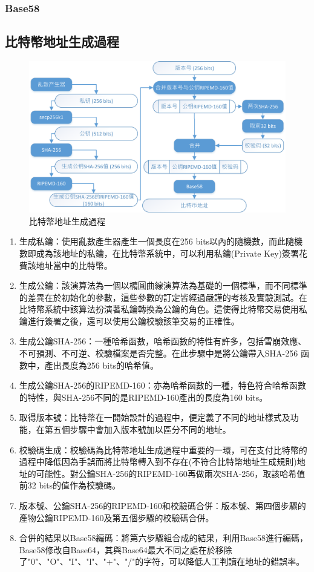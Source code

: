 			\subsubsection{Base58}

		\subsection{比特幣地址生成過程}

		\begin{figure}[h]
				\centering
				\includegraphics[width = .9\textwidth]{address.png}
				\caption{比特幣地址生成過程}\label{address}
		\end{figure}

		\begin{enumerate}
			\item 生成私鑰：使用亂數產生器產生一個長度在256 bits以內的隨機數，而此隨機數即成為該地址的私鑰，在比特幣系統中，可以利用私鑰(Private Key)簽署花費該地址當中的比特幣。
			\item 生成公鑰：該演算法為一個以橢圓曲線演算法為基礎的一個標準，而不同標準的差異在於初始化的參數，這些參數的訂定皆經過嚴謹的考核及實驗測試。在比特幣系統中該算法扮演著私鑰轉換為公鑰的角色。這使得比特幣交易使用私鑰進行簽署之後，還可以使用公鑰校驗該筆交易的正確性。
			\item 生成公鑰SHA-256：一種哈希函數，哈希函數的特性有許多，包括雪崩效應、不可預測、不可逆、校驗檔案是否完整。在此步驟中是將公鑰帶入SHA-256 函數中，產出長度為256 bits的哈希值。
			\item 生成公鑰SHA-256的RIPEMD-160：亦為哈希函數的一種，特色符合哈希函數的特性，與SHA-256不同的是RIPEMD-160產出的長度為160 bits。
			\item 取得版本號：比特幣在一開始設計的過程中，便定義了不同的地址樣式及功能，在第五個步驟中會加入版本號加以區分不同的地址。
			\item 校驗碼生成：校驗碼為比特幣地址生成過程中重要的一環，可在支付比特幣的過程中降低因為手誤而將比特幣轉入到不存在(不符合比特幣地址生成規則)地址的可能性。對公鑰SHA-256的RIPEMD-160再做兩次SHA-256，取該哈希值前32 bits的值作為校驗碼。
			\item 版本號、公鑰SHA-256的RIPEMD-160和校驗碼合併：版本號、第四個步驟的產物公鑰RIPEMD-160及第五個步驟的校驗碼合併。
			\item 合併的結果以Base58編碼：將第六步驟組合成的結果，利用Base58進行編碼，Base58修改自Base64，其與Base64最大不同之處在於移除了"0"、"O"、"I"、"l"、"+"、"/"的字符，可以降低人工判讀在地址的錯誤率。
		\end{enumerate}

